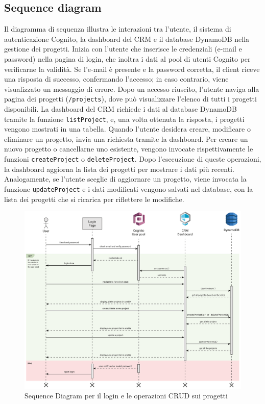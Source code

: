 \documentclass[target=bach,aauheader=,style=]{thud}
\begin{document}
\subsection{Sequence diagram}
Il diagramma di sequenza illustra le interazioni tra l'utente, il sistema di autenticazione Cognito, la dashboard del CRM e il database DynamoDB nella gestione dei progetti. Inizia con l'utente che inserisce le credenziali (e-mail e password) nella pagina di login, che inoltra i dati al pool di utenti Cognito per verificarne la validità. Se l'e-mail è presente e la password corretta, il client riceve una risposta di successo, confermando l'accesso; in caso contrario, viene visualizzato un messaggio di errore. Dopo un accesso riuscito, l'utente naviga alla pagina dei progetti (\texttt{/projects}), dove può visualizzare l'elenco di tutti i progetti disponibili. La dashboard del CRM richiede i dati al database DynamoDB tramite la funzione \texttt{listProject}, e, una volta ottenuta la risposta, i progetti vengono mostrati in una tabella. Quando l'utente desidera creare, modificare o eliminare un progetto, invia una richiesta tramite la dashboard. Per creare un nuovo progetto o cancellarne uno esistente, vengono invocate rispettivamente le funzioni \texttt{createProject} o \texttt{deleteProject}. Dopo l'esecuzione di queste operazioni, la dashboard aggiorna la lista dei progetti per mostrare i dati più recenti. Analogamente, se l'utente sceglie di aggiornare un progetto, viene invocata la funzione \texttt{updateProject} e i dati modificati vengono salvati nel database, con la lista dei progetti che si ricarica per riflettere le modifiche.

\begin{figure}[H]
    \centering
    \includegraphics[width=1\textwidth]{img/diagrammi/sequence.pdf} 
    \caption{Sequence Diagram per il login e le operazioni CRUD sui progetti}
\end{figure}
\end{document}
